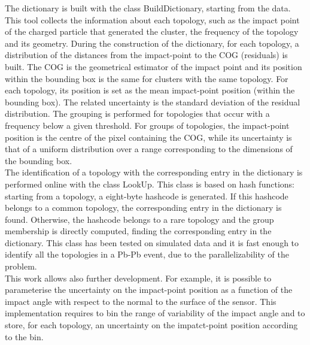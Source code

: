 The dictionary is built with the class BuildDictionary, starting from the data. This tool collects the information about each topology, such as the impact point of the charged particle that generated the cluster, the frequency of the topology and its geometry. During the construction of the dictionary, for each topology, a distribution of the distances from the impact-point to the COG (residuals) is built. The COG is the geometrical estimator of the impact point and its position within the bounding box is the same for clusters with the same topology. For each topology, its position is set as the mean impact-point position (within the bounding box). The related uncertainty is the standard deviation of the residual distribution. The grouping is performed for topologies that occur with a frequency below a given threshold. For groups of topologies, the impact-point position is the centre of the pixel containing the COG, while its uncertainty is that of a uniform distribution over a range corresponding to the dimensions of the bounding box.\\
The identification of a topology with the corresponding entry in the dictionary is performed online with the class LookUp. This class is based on hash functions: starting from a topology, a eight-byte hashcode is generated. If this hashcode belongs to a common topology, the corresponding entry in the dictionary is found. Otherwise, the hashcode belongs to a rare topology and the group membership is directly computed, finding the corresponding entry in the dictionary. This class has been tested on simulated data and it is fast enough to identify all the topologies in a Pb-Pb event, due to the parallelizability of the problem.\\
This work allows also further development. For example, it is possible to parameterise the uncertainty on the impact-point position as a function of the impact angle with respect to the normal to the surface of the sensor. This implementation requires to bin the range of variability of the impact angle and to store, for each topology, an uncertainty on the impatct-point position according to the bin.  
